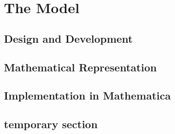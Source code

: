 \documentclass[main.tex]{subfiles}
\begin{document}
  \section{The Model}
    \subsection{Design and Development}
      \lipsum[4]
    \subsection{Mathematical Representation}
      \lipsum[5]
    \subsection{Implementation in Mathematica}
      \lipsum[6]
    \subsection{temporary section}
      \begin{table}
        
      \end{table}
\end{document}
